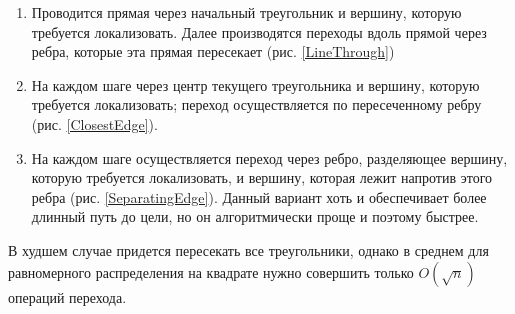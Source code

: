 \documentclass{fefu}
\begin{document}
\begin{enumerate}[label=\alph*]
    \item Проводится прямая через начальный треугольник и вершину, которую требуется локализовать. Далее производятся 
    переходы вдоль прямой через ребра, которые эта прямая пересекает (рис. \ref{LineThrough})
    \item На каждом шаге через центр текущего треугольника и вершину, которую требуется локализовать; 
    переход осуществляется по пересеченному ребру (рис. \ref{ClosestEdge}).
    \item На каждом шаге осуществляется переход через ребро, разделяющее вершину, которую требуется локализовать, и 
    вершину, которая лежит напротив этого ребра (рис. \ref{SeparatingEdge}). Данный вариант хоть и обеспечивает более 
    длинный путь до цели, но он алгоритмически проще и поэтому быстрее. 
\end{enumerate}

В худшем случае придется пересекать все треугольники, однако в среднем для равномерного распределения на квадрате нужно 
совершить только $O(\sqrt{n})$ операций перехода\cite{Shapiro}.
\end{document}
